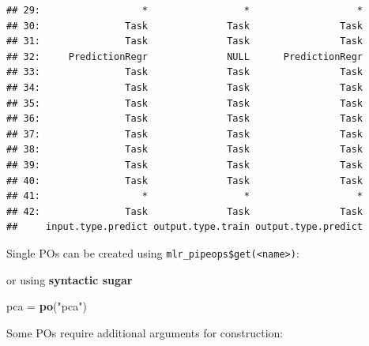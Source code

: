 \documentclass[]{scrbook}
\newenvironment{Shaded}{\begin{snugshade}}{\end{snugshade}}
\newcommand{\CommentTok}[1]{\textcolor[rgb]{0.56,0.35,0.01}{\textit{#1}}}
\newcommand{\KeywordTok}[1]{\textcolor[rgb]{0.13,0.29,0.53}{\textbf{#1}}}
\newcommand{\NormalTok}[1]{#1}
\newcommand{\OperatorTok}[1]{\textcolor[rgb]{0.81,0.36,0.00}{\textbf{#1}}}
\newcommand{\StringTok}[1]{\textcolor[rgb]{0.31,0.60,0.02}{#1}}
\renewenvironment{Shaded} {\begin{snugshade}\small} {\end{snugshade}}
\begin{document}
\begin{verbatim}
## 29:                  *                 *                   *
## 30:               Task              Task                Task
## 31:               Task              Task                Task
## 32:     PredictionRegr              NULL      PredictionRegr
## 33:               Task              Task                Task
## 34:               Task              Task                Task
## 35:               Task              Task                Task
## 36:               Task              Task                Task
## 37:               Task              Task                Task
## 38:               Task              Task                Task
## 39:               Task              Task                Task
## 40:               Task              Task                Task
## 41:                  *                 *                   *
## 42:               Task              Task                Task
##     input.type.predict output.type.train output.type.predict
\end{verbatim}

Single POs can be created using \texttt{mlr\_pipeops\$get(\textless{}name\textgreater{})}:

\begin{Shaded}
\end{Shaded}

or using \textbf{syntactic sugar}

\begin{Shaded}
\begin{Highlighting}[]
\NormalTok{pca =}\StringTok{ }\KeywordTok{po}\NormalTok{(}\StringTok{"pca"}\NormalTok{)}
\end{Highlighting}
\end{Shaded}

Some POs require additional arguments for construction:

\begin{Shaded}
\end{Shaded}
\end{document}
